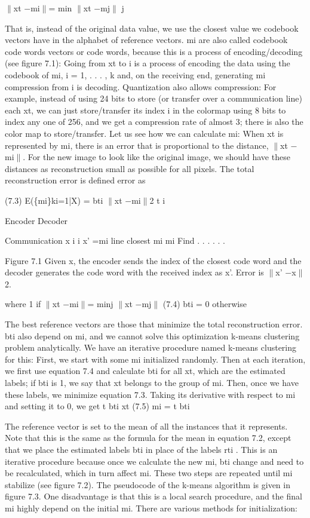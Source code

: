 $\parallel$xt $-$mi$\parallel$= min $\parallel$xt $-$mj$\parallel$ j

That is, instead of the original data value, we use the closest value we codebook vectors have in the alphabet of reference vectors. mi are also called codebook code words vectors or code words, because this is a process of encoding/decoding (see figure 7.1): Going from xt to i is a process of encoding the data using the codebook of mi, i = 1, . . . , k and, on the receiving end, generating mi compression from i is decoding. Quantization also allows compression: For example, instead of using 24 bits to store (or transfer over a communication line) each xt, we can just store/transfer its index i in the colormap using 8 bits to index any one of 256, and we get a compression rate of almost 3; there is also the color map to store/transfer. Let us see how we can calculate mi: When xt is represented by mi, there is an error that is proportional to the distance, $\parallel$xt $-$mi$\parallel$. For the new image to look like the original image, we should have these distances as reconstruction small as possible for all pixels. The total reconstruction error is defined error as

(7.3) E(\{mi\}ki=1|X) = bti $\parallel$xt $-$mi$\parallel$2 t i

Encoder Decoder

Communication x i i x' =mi line closest mi mi Find . . . . . .

Figure 7.1 Given x, the encoder sends the index of the closest code word and the decoder generates the code word with the received index as x'. Error is $\parallel$x' $-$x$\parallel$2.

where 1 if $\parallel$xt $-$mi$\parallel$= minj $\parallel$xt $-$mj$\parallel$ (7.4) bti = 0 otherwise

The best reference vectors are those that minimize the total reconstruction error. bti also depend on mi, and we cannot solve this optimization k-means clustering problem analytically. We have an iterative procedure named k-means clustering for this: First, we start with some mi initialized randomly. Then at each iteration, we first use equation 7.4 and calculate bti for all xt, which are the estimated labels; if bti is 1, we say that xt belongs to the group of mi. Then, once we have these labels, we minimize equation 7.3. Taking its derivative with respect to mi and setting it to 0, we get t bti xt (7.5) mi = t bti

The reference vector is set to the mean of all the instances that it represents. Note that this is the same as the formula for the mean in equation 7.2, except that we place the estimated labels bti in place of the labels rti . This is an iterative procedure because once we calculate the new mi, bti change and need to be recalculated, which in turn affect mi. These two steps are repeated until mi stabilize (see figure 7.2). The pseudocode of the k-means algorithm is given in figure 7.3. One disadvantage is that this is a local search procedure, and the final mi highly depend on the initial mi. There are various methods for initialization:

